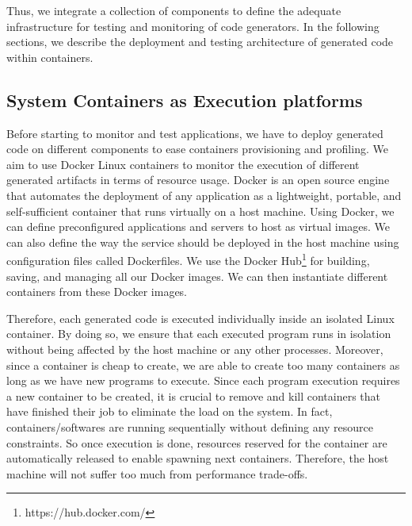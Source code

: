 Thus, we integrate a collection of components to define the adequate infrastructure for testing and monitoring of code generators. 
In the following sections, we describe the deployment and testing architecture of generated code within containers.

\subsection{System Containers as Execution platforms}

Before starting to monitor and test applications, we have to deploy generated code on different components to ease containers provisioning and profiling.
We aim to use Docker Linux containers to monitor the execution of different generated artifacts in terms of resource usage. 
Docker is an open source engine that automates the deployment of any application as a lightweight, portable, and self-sufficient container that runs virtually on a host machine. 
Using Docker, we can define preconfigured applications and servers to host as virtual images. We can also define the way the service should be deployed in the host machine using configuration files called Dockerfiles. 
We use the Docker Hub\footnote{https://hub.docker.com/} for building, saving, and managing all our Docker images. 
We can then instantiate different containers from these Docker images. 

Therefore, each generated code is executed individually inside an isolated Linux container. By doing so, we ensure that each executed program runs in isolation without being affected by the host machine or any other processes. Moreover, since a container is cheap to create, we are able to create too many containers as long as we have new programs to execute.  
Since each program execution requires a new container to be created, it is crucial to remove and kill containers that have finished their job to eliminate the load on the system. In fact, containers/softwares are running sequentially without defining any resource constraints. So once execution is done, resources reserved for the container are automatically released to enable spawning next containers. Therefore, the host machine will not suffer too much from performance trade-offs.

